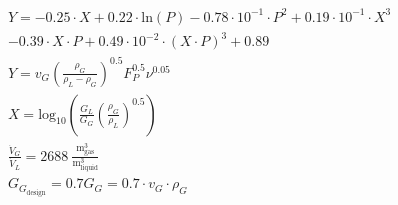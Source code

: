 \begin{refsection}[referencesCh6]

\begin{align}
	&Y =  - 0.25 \cdot X + 0.22 \cdot \text{ln}(P) - 0.78\cdot10^{-1} \cdot P^2 + 0.19\cdot10^{-1} \cdot X^3 \nonumber \\
	& - 0.39 \cdot X \cdot P + 0.49\cdot10^{-2} \cdot (X\cdot P)^3 + 0.89 \label{eq:FloodingALAMO} \\
	&Y = v_G \left(\frac{\rho_G}{\rho_L-\rho_G}\right)^{0.5} F_{P}^{0.5} \nu^{0.05} \\
	&X = \text{log}_{10} \left(\frac{G_L}{G_G} \left(\frac{\rho_G}{\rho_L}\right)^{0.5}\right) \\
	&\frac{\dot{V}_G}{\dot{V}_L} = 2688 \ \frac{\text{m}^3_{\text{gas}}}{\text{m}^3_{\text{liquid}}} \label{eq:OpLine}
	\\
	& G_{G_{\text{design}}} = 0.7 G_G = 0.7 \cdot v_G \cdot \rho_G\label{eq:G_Design}
\end{align}


\end{refsection}
